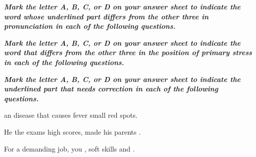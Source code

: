 \documentclass[11pt]{article}
\begin{document}
\sf
% 

\begin{multiplechoice}[rearrange=yes, keycolumns=2]%

\examvspace*{1cm}
\textit{\textbf{Mark the letter A, B, C, or D on your answer sheet to indicate the word whose underlined part
differs from the other three in pronunciation in each of the following questions.}}

\begin{question}%
\datcot
\bonpat
{}
{ }
{ }
{}
\end{question}

\begin{question}%
\datcot
\bonpat
{ }
{}
{ }
{}
\end{question}
\end{multiplechoice}

\begin{multiplechoice}[rearrange=yes, keycolumns=2]%
\examvspace*{0.7cm}
\textit{\textbf{Mark the letter A, B, C, or D on your answer sheet to indicate the word that differs from the other
three in the position of primary stress in each of the following questions.}}

\begin{question}
\datcot
\bonpat
{}
{ }
{}
{}
\end{question}

\begin{question}
\datcot
\bonpat
{}
{}
{ }
{}
\end{question}

\end{multiplechoice}


\begin{multiplechoice}[rearrange=yes, keycolumns=2]%
\examvspace*{0.7cm}
\textit{\textbf{Mark the letter A, B, C, or D on your answer sheet to indicate the underlined part that needs
correction in each of the following questions.}}

\begin{question}
  an  disease that causes fever  small red spots.
\datcot
\bonpah
{}
{}
{}
{}
\end{question}

\begin{question}
He  the exams  high scores,  made his parents .
\datcot
\bonpah
{}
{}
{}
{}
\end{question}

\begin{question}
For  a demanding job, you  , soft skills and .
\datcot
\bonpah
{}
{}
{}
{ }
\end{question}
\end{multiplechoice}
\end{document}
